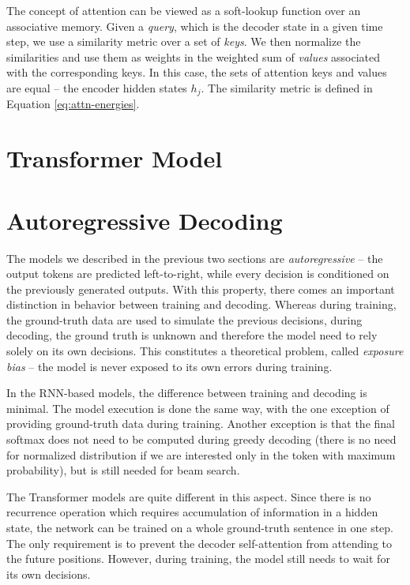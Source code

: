 The concept of attention can be viewed as a soft-lookup function over an
associative memory. Given a \emph{query}, which is the decoder state in a given
time step, we use a similarity metric over a set of \emph{keys}. We then
normalize the similarities and use them as weights in the weighted sum of
\emph{values} associated with the corresponding keys. In this case, the sets of
attention keys and values are equal -- the encoder hidden states $h_j$. The
similarity metric is defined in Equation \ref{eq:attn-energies}.


\section{Transformer Model}
\label{sec:transformer}



\section{Autoregressive Decoding}
\label{sec:training-vs-inference}

The models we described in the previous two sections are \emph{autoregressive}
-- the output tokens are predicted left-to-right, while every decision is
conditioned on the previously generated outputs. With this property, there comes
an important distinction in behavior between training and decoding. Whereas
during training, the ground-truth data are used to simulate the previous
decisions, during decoding, the ground truth is unknown and therefore the model
need to rely solely on its own decisions. This constitutes a theoretical
problem, called \emph{exposure bias} -- the model is never exposed to its own
errors during training.

In the RNN-based models, the difference between training and decoding is
minimal. The model execution is done the same way, with the one exception of
providing ground-truth data during training. Another exception is that the final
softmax does not need to be computed during greedy decoding (there is no need
for normalized distribution if we are interested only in the token with maximum
probability), but is still needed for beam search.


The Transformer models are quite different in this aspect. Since there is no
recurrence operation which requires accumulation of information in a hidden
state, the network can be trained on a whole ground-truth sentence in one step.
The only requirement is to prevent the decoder self-attention from attending to
the future positions. However, during training, the model still needs to wait
for its own decisions.




